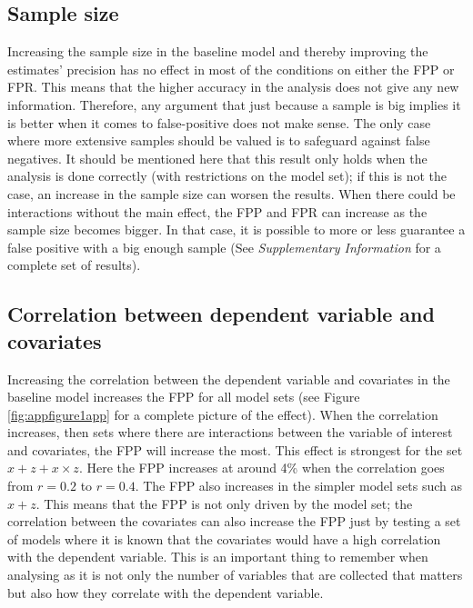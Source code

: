 \subsection{Sample size}
Increasing the sample size in the baseline model and thereby improving the estimates' precision has no effect in most of the conditions on either the FPP or FPR. This means that the higher accuracy in the analysis does not give any new information. Therefore, any argument that just because a sample is big implies it is better when it comes to false-positive does not make sense. The only case where more extensive samples should be valued is to safeguard against false negatives. It should be mentioned here that this result only holds when the analysis is done correctly (with restrictions on the model set); if this is not the case, an increase in the sample size can worsen the results. When there could be interactions without the main effect, the FPP and FPR can increase as the sample size becomes bigger. In that case, it is possible to more or less guarantee a false positive with a big enough sample (See \textit{Supplementary Information} for a complete set of results).


\subsection{Correlation between dependent variable and covariates}
Increasing the correlation between the dependent variable and covariates in the baseline model increases the FPP for all model sets (see Figure \ref{fig:appfigure1app} for a complete picture of the effect). When the correlation increases, then sets where there are interactions between the variable of interest and covariates, the FPP will increase the most. This effect is strongest for the set $x + z+ x \times z $. Here the FPP increases at around 4\% when the correlation goes from $r=0.2$ to $r=0.4$. The FPP also increases in the simpler model sets such as $x + z$. This means that the FPP is not only driven by the model set; the correlation between the covariates can also increase the FPP just by testing a set of models where it is known that the covariates would have a high correlation with the dependent variable. This is an important thing to remember when analysing as it is not only the number of variables that are collected that matters but also how they correlate with the dependent variable. 


